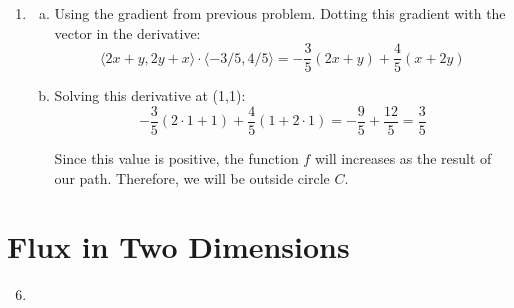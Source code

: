 \documentclass{article}
\begin{document}
\begin{enumerate}[1.]
  \item \begin{enumerate}[a.]
      \item Using the gradient from previous problem. Dotting this gradient with
        the vector in the derivative:
        $$ \langle 2x + y, 2y + x \rangle \cdot \langle -3/5, 4/5 \rangle =
        -\frac{ 3 }{ 5 }(2x + y) + \frac{ 4 }{ 5 }(x + 2y) $$

        \item Solving this derivative at (1,1):
          $$ -\frac{ 3 }{ 5 }(2 \cdot 1 + 1) + \frac{ 4 }{ 5 }(1 + 2 \cdot 1) =
          -\frac{ 9 }{ 5 } + \frac{ 12 }{ 5 } = \frac{ 3 }{ 5 } $$

          Since this value is positive, the function $f$ will increases as the
          result of our path. Therefore, we will be outside circle $C$.
    \end{enumerate}
\end{enumerate}

\section{Flux in Two Dimensions}

\begin{enumerate}[1.]
  \setcounter{enumi}{5}
  \item
\end{enumerate}
\end{document}
